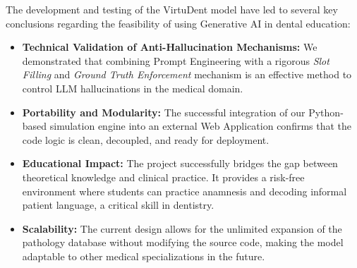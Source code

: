 \documentclass{article}
\begin{document}
The development and testing of the VirtuDent model have led to several key conclusions regarding the feasibility of using Generative AI in dental education:

\begin{itemize}[itemsep=0.8em]
    \item \textbf{Technical Validation of Anti-Hallucination Mechanisms:} 
    We demonstrated that combining Prompt Engineering with a rigorous \textit{Slot Filling} and \textit{Ground Truth Enforcement} mechanism is an effective method to control LLM hallucinations in the medical domain.
    
    \item \textbf{Portability and Modularity:} 
    The successful integration of our Python-based simulation engine into an external Web Application confirms that the code logic is clean, decoupled, and ready for deployment.
    
    \item \textbf{Educational Impact:} 
    The project successfully bridges the gap between theoretical knowledge and clinical practice. It provides a risk-free environment where students can practice anamnesis and decoding informal patient language, a critical skill in dentistry.
    
    \item \textbf{Scalability:} 
    The current design allows for the unlimited expansion of the pathology database without modifying the source code, making the model adaptable to other medical specializations in the future.
\end{itemize}
\end{document}
